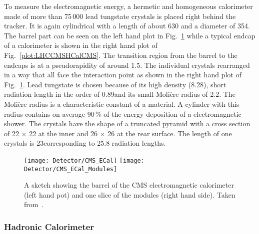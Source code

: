 To measure the electromagnetic energy, a hermetic and homogeneous calorimeter made of more than 75\,000 lead tungstate crystals is placed right behind the tracker. It is again cylindrical with a length of about 630\cm{} and a diameter of 354\cm. The barrel part can be seen on the left hand plot in Fig.~\ref{plot:LHCCMSECalCMS} while a typical endcap of a calorimeter is shown in the right hand plot of Fig.~\ref{plot:LHCCMSHCalCMS}. The transition region from the barrel to the endcaps is at a pseudorapidity of around 1.5. The individual crystals rearranged in a way that all face the interaction point as shown in the right hand plot of Fig.~\ref{plot:LHCCMSECalCMS}. Lead tungstate is chosen because of its high density (8.28\gcmc{}), short radiation length in the order of 0.89\cm and its small Moli\`ere radius of 2.2\cm{}. The Moli\`ere radius is a characteristic constant of a material. A cylinder with this radius contains on average $90\,\%$ of the energy deposition of a electromagnetic shower. The crystals have the shape of a truncated pyramid with a cross section of 22 $\times{}$ 22\mms{} at the inner and 26 $\times{}$ 26\mms{} at the rear surface. The length of one crystals is 23\cm corresponding to 25.8 radiation lengths.

\begin{figure}[Htb]
  \centering
  \texttt{[image: Detector/CMS\_ECal]}
  \texttt{[image: Detector/CMS\_ECal\_Modules]}
  \caption[Sketches of the electromagnetic calorimeter of CMS]{A sketch showing the barrel of the CMS electromagnetic calorimeter (left hand pot) and one slice of the modules (right hand side). Taken from~. \label{plot:LHCCMSECalCMS}}
\end{figure}

\subsubsection{Hadronic Calorimeter}

